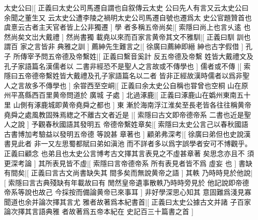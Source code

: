 太史公曰|[%
正義曰太史公司馬遷自謂也自叙傳云太史%
公曰先人有言又云太史公曰余聞之董生又%
%
云太史公遭李陵之禍明太史公司馬遷自號也遷爲太%
史公官題贊首也虞憙云古者主天官者皆上公非獨遷%
]%
學%
者多稱五帝尚矣|[%
索隱曰尚上也言乆逺%
也然尚矣文岀大戴禮%
]%
然尚書獨%
載堯以來而百家言黄帝其文不雅馴|[%
正義曰馴%
訓也謂百%
%
家之言皆非%
典雅之訓%
]%
薦紳先生難言之|[%
徐廣曰薦紳即縉%
紳也古字假借%
]%
孔子%
所傳宰予問五帝德及帝繫姓|[%
正義曰繫音奚計%
反五帝德及帝繫%
%
姓皆大戴禮文及孔子家語篇名漢儒者以%
二書非經恐不是聖人之言故或不傳學也%
]%
儒者或不傳%
|[%
索隱曰五帝德帝繫姓皆大戴禮及孔子家語篇名以二者%
皆非正經故漢時儒者以爲非聖人之言故多不傳學也%
]%
余甞西至空峒|[%
正義曰余太史公自稱也甞曾也空桐%
山在原州平髙縣西百里黄帝問道於%
%
廣城%
子處%
]%
北過涿鹿|[%
正義曰涿鹿山在嬀州東南五十里%
山側有涿鹿城即黄帝堯舜之都也%
]%
東%
漸於海南浮江淮矣至長老皆各往往稱黄帝%
堯舜之處風教固殊焉緫之不離古文者近是%
|[%
索隱曰古文即帝德帝系%
二書也近是聖人之說%
]%
予觀春秋國語其發明五%
帝德帝繫姓章矣|[%
索隱曰太史公言己以春秋國語%
古書博加考驗益以發明五帝德%
%
等說甚%
章著也%
]%
顧弟弗深考|[%
徐廣曰弟但也史說漢書見此者%
非一又左思蜀都賦曰弟如滇池%
%
而不詳者多以爲字誤學者安可不博觀乎。正義曰顧念%
也弟且也太史公言博考古文擇其言表見之不虛甚章著%
%
矣思念亦且不%
須更深考論%
]%
其所表見皆不虛|[%
索隱曰言帝德帝系%
所有表見者皆不爲%
%
虛妄%
也%
]%
書缺有間矣|[%
正義曰言古文尚書缺失其%
間多矣而無說黄帝之語%
]%
其軼%
乃時時見於他說|[%
索隱曰言古典殘缺有年載故曰有%
閒然皇帝遺事散軼乃時時旁見於%
%
他記說即帝德帝系等說也故己%
今採按而備論黄帝已來事耳%
]%
非好學深思心知其%
意固難爲淺見寡聞道也余并論次擇其言尤%
雅者故著爲本紀書首|[%
正義曰太史公據古文并諸%
子百家論次擇其言語典雅%
%
者故著爲五帝本紀在%
史記百三十篇書之首%
]
